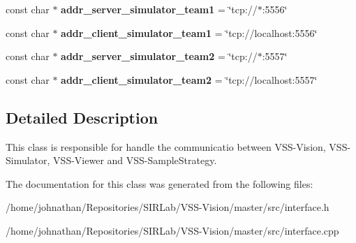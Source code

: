 \begin{DoxyCompactItemize}
\item 
const char $\ast$ {\bfseries addr\+\_\+server\+\_\+simulator\+\_\+team1} = \char`\"{}tcp\+://$\ast$\+:5556\char`\"{}\hypertarget{classInterface_a4315a24cd5d7156ccb6da180cc5a825e}{}\label{classInterface_a4315a24cd5d7156ccb6da180cc5a825e}

\item 
const char $\ast$ {\bfseries addr\+\_\+client\+\_\+simulator\+\_\+team1} = \char`\"{}tcp\+://localhost\+:5556\char`\"{}\hypertarget{classInterface_aa05d667c54fc41c5dc6fe7aa8a85ef5d}{}\label{classInterface_aa05d667c54fc41c5dc6fe7aa8a85ef5d}

\item 
const char $\ast$ {\bfseries addr\+\_\+server\+\_\+simulator\+\_\+team2} = \char`\"{}tcp\+://$\ast$\+:5557\char`\"{}\hypertarget{classInterface_ae358e6d8cb691934a5dc23c4a718082b}{}\label{classInterface_ae358e6d8cb691934a5dc23c4a718082b}

\item 
const char $\ast$ {\bfseries addr\+\_\+client\+\_\+simulator\+\_\+team2} = \char`\"{}tcp\+://localhost\+:5557\char`\"{}\hypertarget{classInterface_adad17a36b3382235441861a3648bd807}{}\label{classInterface_adad17a36b3382235441861a3648bd807}

\end{DoxyCompactItemize}


\subsection{Detailed Description}
This class is responsible for handle the communicatio between V\+S\+S-\/\+Vision, V\+S\+S-\/\+Simulator, V\+S\+S-\/\+Viewer and V\+S\+S-\/\+Sample\+Strategy. 

The documentation for this class was generated from the following files\+:\begin{DoxyCompactItemize}
\item 
/home/johnathan/\+Repositories/\+S\+I\+R\+Lab/\+V\+S\+S-\/\+Vision/master/src/interface.\+h\item 
/home/johnathan/\+Repositories/\+S\+I\+R\+Lab/\+V\+S\+S-\/\+Vision/master/src/interface.\+cpp\end{DoxyCompactItemize}
